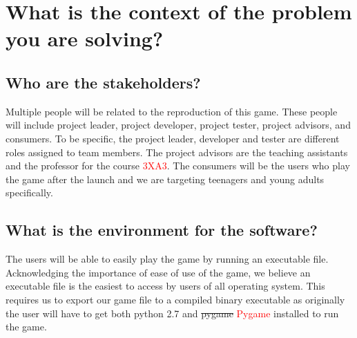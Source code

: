 \documentclass[12pt]{article}
\begin{document}
\section {What is the context of the problem you are solving?}
    \subsection {Who are the stakeholders?}
    Multiple people will be related to the reproduction of this game. These people will include project leader, project developer, project tester, project advisors, and consumers. To be specific, the project leader, developer and tester are different roles assigned to team members. The project advisors are the teaching assistants and the professor for the course \textcolor{red}{3XA3}. The consumers will be the users who play the game after the launch and we are targeting teenagers and young adults specifically. 

    \subsection {What is the environment for the software?}
    The users will be able to easily play the game by running an executable file. Acknowledging the importance of ease of use of the game, we believe an executable file is the easiest to access by users of all operating system. This requires us to export our game file to a compiled binary executable as originally the user will have to get both python 2.7 and \st{pygame} \textcolor{red}{Pygame} installed to run the game.
\end{document}
